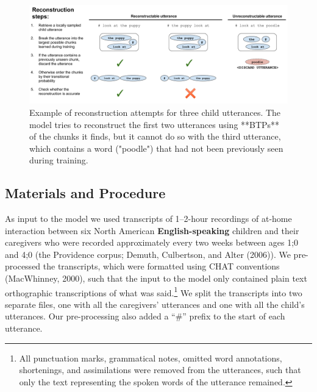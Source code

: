 \documentclass[
  english,
  man,mask,floatsintext]{apa6}
\begin{document}
\begin{figure}
\includegraphics[width=0.99\linewidth]{images/reconstruction_task} \caption{Example of reconstruction attempts for three child utterances. The model tries to reconstruct the first two utterances using **BTPs** of the chunks it finds, but it cannot do so with the third utterance, which contains a word  ("poodle") that had not been previously seen during training.}\label{fig:fig2}
\end{figure}

\hypertarget{materials-and-procedure}{%
\subsection{Materials and Procedure}\label{materials-and-procedure}}

As input to the model we used transcripts of 1--2-hour recordings of at-home interaction between six North American \textbf{English-speaking} children and their caregivers who were recorded approximately every two weeks between ages 1;0 and 4;0 (the Providence corpus; Demuth, Culbertson, and Alter (2006)). We pre-processed the transcripts, which were formatted using CHAT conventions (MacWhinney, 2000), such that the input to the model only contained plain text orthographic transcriptions of what was said.\footnote{All punctuation marks, grammatical notes, omitted word annotations, shortenings, and assimilations were removed from the utterances, such that only the text representing the spoken words of the utterance remained.} We split the transcripts into two separate files, one with all the caregivers' utterances and one with all the child's utterances. Our pre-processing also added a \enquote{\#} prefix to the start of each utterance.
\end{document}
